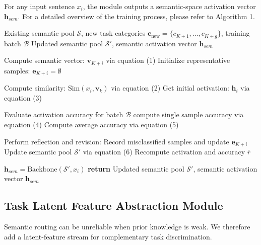\documentclass[11pt]{article}
\begin{document}
For any input sentence $x_i$, the module outputs a semantic-space activation vector $\mathbf{h}_{sem}$. For a detailed overview of the training process, please refer to Algorithm 1.
\begin{algorithm}[t]
\caption{Dynamic Task Category Semantic Extraction Module}
\begin{algorithmic}[1]
\REQUIRE Existing semantic pool $\mathcal{S}$, new task categories $\mathbf{c}_{\text{new}} = \{c_{K+1}, \dots, c_{K+g}\}$, training batch $\mathcal{B}$
\ENSURE Updated semantic pool $\mathcal{S}'$, semantic activation vector $\mathbf{h}_{sem}$

    \STATE Compute semantic vector: $\mathbf{v}_{K+i}$ via equation (1)
    \STATE Initialize representative samples: $\mathbf{e}_{K+i} = \emptyset$
\ENDFOR


        \STATE Compute similarity: $\text{Sim}(x_i, \mathbf{v}_k)$ via equation (2)
    \ENDFOR
    \STATE Get initial activation: $\mathbf{h}_i$ via equation (3) 
\ENDFOR

\STATE Evaluate activation accuracy for batch $\mathcal{B}$
    \STATE compute single sample accuracy via equation (4)
\ENDFOR
\STATE Compute average accuracy via equation (5)

    \STATE Perform reflection and revision:
    \STATE \quad Record misclassified samples and update $\mathbf{e}_{K+i}$
    \STATE Update semantic pool $\mathcal{S}'$ via equation (6)
    \STATE Recompute activation and accuracy $\bar{r}$
\ENDWHILE

\STATE $\mathbf{h}_{sem} = \text{Backbone}(\mathcal{S}', x_i)$
\STATE \textbf{return} Updated semantic pool $\mathcal{S}'$, semantic activation vector $\mathbf{h}_{sem}$

\end{algorithmic}
\end{algorithm}

\subsection{Task Latent Feature Abstraction Module}




Semantic routing can be unreliable when prior knowledge is weak. We therefore add a latent-feature stream for complementary task discrimination.
\end{document}
